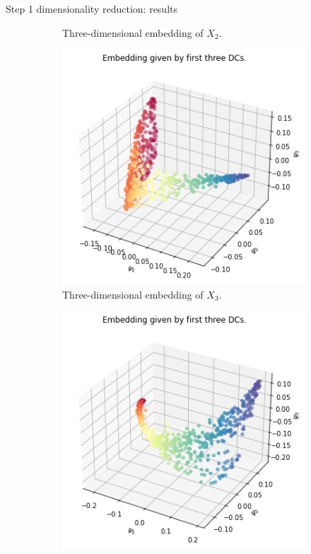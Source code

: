 \documentclass[xcolor={dvipsnames,svgnames}]{beamer}
\begin{document}
\begin{frame}{Step 1 dimensionality reduction: results}
\begin{figure}[H]
\begin{subfigure}[b]{0.3\textwidth}
    \caption{Three-dimensional embedding of $X_2$.}
\end{subfigure}
\hfill
\begin{subfigure}[b]{0.3\textwidth}
    \includegraphics[width=\textwidth]{figures/X3_embedding.png}
    \caption{Three-dimensional embedding of $X_3$.}
\end{subfigure}
\hfill
\begin{subfigure}[b]{0.3\textwidth}
    \includegraphics[width=\textwidth]{figures/X4_embedding.png}

\end{subfigure}
\end{figure}
\end{frame}
\end{document}
